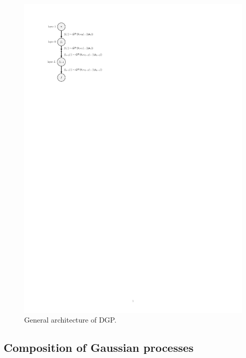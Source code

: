 \documentclass[journal ]{new-aiaa}
\begin{document}
	\begin{figure}
		\centering
		\includegraphics[scale=0.8]{Fig6.pdf}
		\caption{General architecture of DGP.}
		\label{Fig-6}
	\end{figure}
	
	\subsection{Composition of Gaussian processes}\label{Sec45}
	
\end{document}
